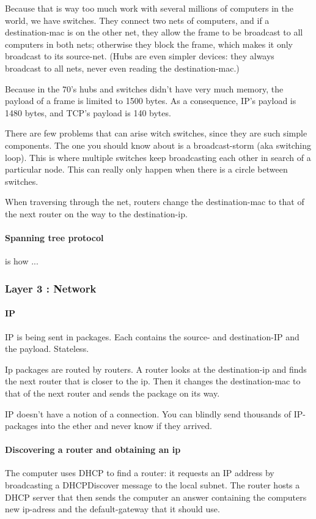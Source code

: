 Because that is way too much work with several millions of computers in the world, we have switches. They connect two nets of computers, and if a destination-mac is on the other net, they allow the frame to be broadcast to all computers in both nets; otherwise they block the frame, which makes it only broadcast to its source-net. (Hubs are even simpler devices: they always broadcast to all nets, never even reading the destination-mac.)

Because in the 70's hubs and switches didn't have very much memory, the payload of a frame is limited to 1500 bytes. As a consequence, IP's payload is 1480 bytes, and TCP's payload is 140 bytes.

There are few problems that can arise witch switches, since they are such simple components. The one you should know about is a broadcast-storm (aka switching loop). This is where multiple switches keep broadcasting each other in search of a particular node. This can really only happen when there is a circle between switches. 

When traversing through the net, routers change the destination-mac to that of the next router on the way to the destination-ip.

\paragraph{Spanning tree protocol} is how ...

\subsubsection{Layer 3 : Network}

\paragraph{IP} 

IP is being sent in packages. Each contains the source- and destination-IP and the payload. Stateless.

Ip packages are routed by routers. A router looks at the destination-ip and finds the next router that is closer to the ip. Then it changes the destination-mac to that of the next router and sends the package on its way.

IP doesn't have a notion of a connection. You can blindly send thousands of IP-packages into the ether and never know if they arrived. 

\paragraph{Discovering a router and obtaining an ip} The computer uses DHCP to find a router: it requests an IP address by broadcasting a DHCPDiscover message to the local subnet. The router hosts a DHCP server that then sends the computer an answer containing the computers new ip-adress and the default-gateway that it should use. 

